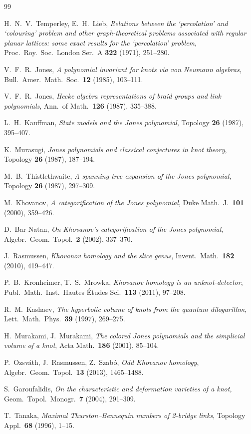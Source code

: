 \documentclass[12pt,a4paper]{amsart}
\theoremstyle{definition}
\theoremstyle{remark}
\begin{document}
\begin{thebibliography}{99}

H.~N.~V.~Temperley, E.~H.~Lieb,
\textit{Relations between the `percolation' and `colouring' problem and
other graph-theoretical problems associated with regular planar lattices:
some exact results for the `percolation' problem},
Proc.\ Roy.\ Soc.\ London Ser.\ A \textbf{322} (1971), 251--280.

V.~F.~R.~Jones,
\textit{A polynomial invariant for knots via von Neumann algebras},
Bull.\ Amer.\ Math.\ Soc.\ \textbf{12} (1985), 103--111.

V.~F.~R.~Jones,
\textit{Hecke algebra representations of braid groups and link polynomials},
Ann.\ of Math.\ \textbf{126} (1987), 335--388.

L.~H.~Kauffman,
\textit{State models and the Jones polynomial},
Topology \textbf{26} (1987), 395--407.

K.~Murasugi,
\textit{Jones polynomials and classical conjectures in knot theory},
Topology \textbf{26} (1987), 187--194.

M.~B.~Thistlethwaite,
\textit{A spanning tree expansion of the Jones polynomial},
Topology \textbf{26} (1987), 297--309.

M.~Khovanov,
\textit{A categorification of the Jones polynomial},
Duke Math.\ J.\ \textbf{101} (2000), 359--426.

D.~Bar-Natan,
\textit{On Khovanov's categorification of the Jones polynomial},
Algebr.\ Geom.\ Topol.\ \textbf{2} (2002), 337--370.

J.~Rasmussen,
\textit{Khovanov homology and the slice genus},
Invent.\ Math.\ \textbf{182} (2010), 419--447.

P.~B.~Kronheimer, T.~S.~Mrowka,
\textit{Khovanov homology is an unknot-detector},
Publ.\ Math.\ Inst.\ Hautes Études Sci.\ \textbf{113} (2011), 97--208.

R.~M.~Kashaev,
\textit{The hyperbolic volume of knots from the quantum dilogarithm},
Lett.\ Math.\ Phys.\ \textbf{39} (1997), 269--275.

H.~Murakami, J.~Murakami,
\textit{The colored Jones polynomials and the simplicial volume of a knot},
Acta Math.\ \textbf{186} (2001), 85--104.

P.~Ozsváth, J.~Rasmussen, Z.~Szabó,
\textit{Odd Khovanov homology},
Algebr.\ Geom.\ Topol.\ \textbf{13} (2013), 1465--1488.

S.~Garoufalidis,
\textit{On the characteristic and deformation varieties of a knot},
Geom.\ Topol.\ Monogr.\ \textbf{7} (2004), 291--309.

T.~Tanaka,
\textit{Maximal Thurston--Bennequin numbers of 2-bridge links},
Topology Appl.\ \textbf{68} (1996), 1--15.

\end{thebibliography}
\end{document}
